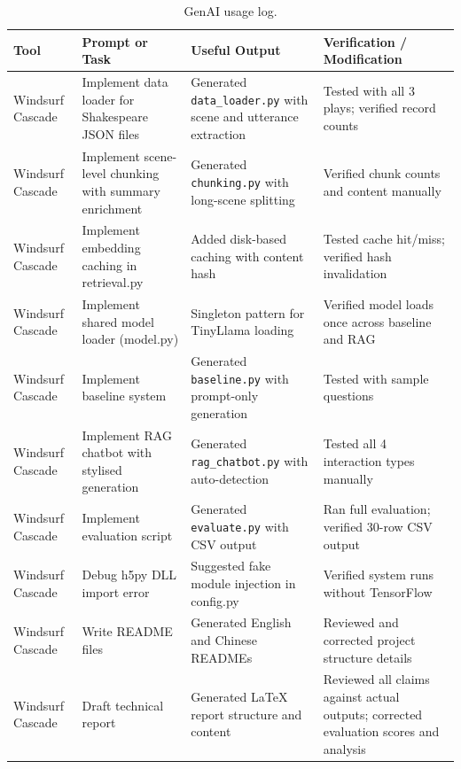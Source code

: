 \documentclass[10pt,conference]{IEEEtran}
\begin{document}
\begin{table}[h]
\centering
\caption{GenAI usage log.}
\label{tab:genai-log}
\begin{tabularx}{\textwidth}{p{2.2cm} p{3.0cm} p{3.0cm} X}
\toprule
Tool & Prompt or Task & Useful Output & Verification / Modification \\
\midrule
Windsurf Cascade & Implement data loader for Shakespeare JSON files & Generated \texttt{data\_loader.py} with scene and utterance extraction & Tested with all 3 plays; verified record counts \\
\midrule
Windsurf Cascade & Implement scene-level chunking with summary enrichment & Generated \texttt{chunking.py} with long-scene splitting & Verified chunk counts and content manually \\
\midrule
Windsurf Cascade & Implement embedding caching in retrieval.py & Added disk-based caching with content hash & Tested cache hit/miss; verified hash invalidation \\
\midrule
Windsurf Cascade & Implement shared model loader (model.py) & Singleton pattern for TinyLlama loading & Verified model loads once across baseline and RAG \\
\midrule
Windsurf Cascade & Implement baseline system & Generated \texttt{baseline.py} with prompt-only generation & Tested with sample questions \\
\midrule
Windsurf Cascade & Implement RAG chatbot with stylised generation & Generated \texttt{rag\_chatbot.py} with auto-detection & Tested all 4 interaction types manually \\
\midrule
Windsurf Cascade & Implement evaluation script & Generated \texttt{evaluate.py} with CSV output & Ran full evaluation; verified 30-row CSV output \\
\midrule
Windsurf Cascade & Debug h5py DLL import error & Suggested fake module injection in config.py & Verified system runs without TensorFlow \\
\midrule
Windsurf Cascade & Write README files & Generated English and Chinese READMEs & Reviewed and corrected project structure details \\
\midrule
Windsurf Cascade & Draft technical report & Generated LaTeX report structure and content & Reviewed all claims against actual outputs; corrected evaluation scores and analysis \\
\bottomrule
\end{tabularx}
\end{table}
\end{document}
